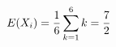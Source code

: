 \documentclass[preview]{standalone}
\begin{document}
\begin{align*}
\special{dvisvgm:raw <g id='unique000'>}E(X_i)=\frac16\sum_{k=1}^6k=\frac72\special{dvisvgm:raw </g>}
\end{align*}
\end{document}
